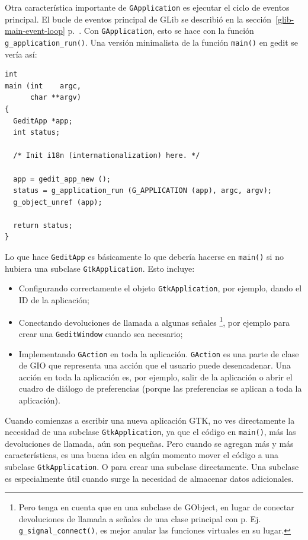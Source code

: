Otra característica importante de \lstinline {GApplication} es ejecutar el ciclo de eventos principal. El bucle de eventos principal de GLib se describió en la sección~\ref{glib-main-event-loop} p.~\pageref{glib-main-event-loop}. Con \lstinline{GApplication}, esto se hace con la función \lstinline{g_application_run()}. Una versión minimalista de la función \lstinline{main()} en gedit se vería así:

\begin{lstlisting}
int
main (int    argc,
      char **argv)
{
  GeditApp *app;
  int status;

  /* Init i18n (internationalization) here. */

  app = gedit_app_new ();
  status = g_application_run (G_APPLICATION (app), argc, argv);
  g_object_unref (app);

  return status;
}
\end{lstlisting}

Lo que hace \lstinline{GeditApp} es básicamente lo que debería hacerse en \lstinline{main()} si no hubiera una subclase \lstinline{GtkApplication}. Esto incluye:
\begin{itemize}
  \item Configurando correctamente el objeto \lstinline{GtkApplication}, por ejemplo, dando el ID de la aplicación;
  \item Conectando devoluciones de llamada a algunas señales \footnote{Pero tenga en cuenta que en una subclase de GObject, en lugar de conectar devoluciones de llamada a señales de una clase principal con p. Ej. \lstinline{g_signal_connect()}, es mejor anular las funciones virtuales en su lugar.}, por ejemplo para crear una \lstinline{GeditWindow} cuando sea necesario;
  \item Implementando \lstinline{GAction} en toda la aplicación. \lstinline{GAction} es una parte de clase de GIO que representa una acción que el usuario puede desencadenar. Una acción en toda la aplicación es, por ejemplo, salir de la aplicación o abrir el cuadro de diálogo de preferencias (porque las preferencias se aplican a toda la aplicación).
\end{itemize}

Cuando comienzas a escribir una nueva aplicación GTK, no ves directamente la necesidad de una subclase \lstinline{GtkApplication}, ya que el código en \lstinline{main()}, más las devoluciones de llamada, aún son pequeñas. Pero cuando se agregan más y más características, es una buena idea en algún momento mover el código a una subclase \lstinline{GtkApplication}. O para crear una subclase directamente. Una subclase es especialmente útil cuando surge la necesidad de almacenar datos adicionales.

